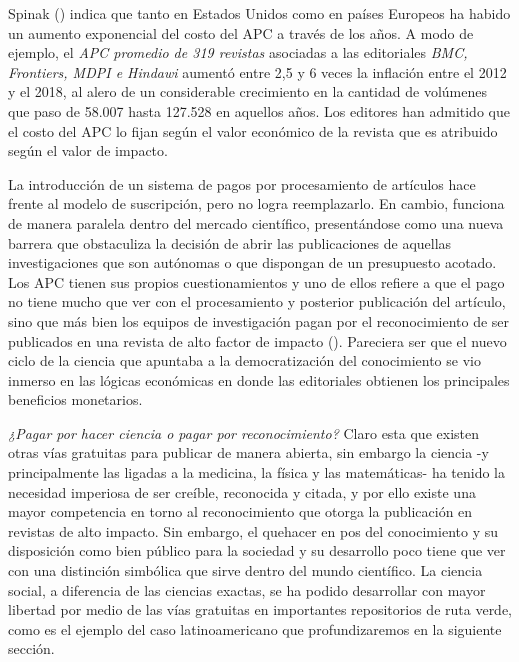 \documentclass[
  spanish,
  a4paper,
  oneside]{scrbook}
\begin{document}
Spinak () indica que tanto en
Estados Unidos como en países Europeos ha habido un aumento exponencial
del costo del APC a través de los años. A modo de ejemplo, el \emph{APC
promedio de 319 revistas} asociadas a las editoriales \emph{BMC,
Frontiers, MDPI e Hindawi} aumentó entre 2,5 y 6 veces la inflación
entre el 2012 y el 2018, al alero de un considerable crecimiento en la
cantidad de volúmenes que paso de 58.007 hasta 127.528 en aquellos años.
Los editores han admitido que el costo del APC lo fijan según el valor
económico de la revista que es atribuido según el valor de impacto.

La introducción de un sistema de pagos por procesamiento de artículos
hace frente al modelo de suscripción, pero no logra reemplazarlo. En
cambio, funciona de manera paralela dentro del mercado científico,
presentándose como una nueva barrera que obstaculiza la decisión de
abrir las publicaciones de aquellas investigaciones que son autónomas o
que dispongan de un presupuesto acotado. Los APC tienen sus propios
cuestionamientos y uno de ellos refiere a que el pago no tiene mucho que
ver con el procesamiento y posterior publicación del artículo, sino que
más bien los equipos de investigación pagan por el reconocimiento de ser
publicados en una revista de alto factor de impacto
(). Pareciera
ser que el nuevo ciclo de la ciencia que apuntaba a la democratización
del conocimiento se vio inmerso en las lógicas económicas en donde las
editoriales obtienen los principales beneficios monetarios.

\emph{¿Pagar por hacer ciencia o pagar por reconocimiento?} Claro esta
que existen otras vías gratuitas para publicar de manera abierta, sin
embargo la ciencia -y principalmente las ligadas a la medicina, la
física y las matemáticas- ha tenido la necesidad imperiosa de ser
creíble, reconocida y citada, y por ello existe una mayor competencia en
torno al reconocimiento que otorga la publicación en revistas de alto
impacto. Sin embargo, el quehacer en pos del conocimiento y su
disposición como bien público para la sociedad y su desarrollo poco
tiene que ver con una distinción simbólica que sirve dentro del mundo
científico. La ciencia social, a diferencia de las ciencias exactas, se
ha podido desarrollar con mayor libertad por medio de las vías gratuitas
en importantes repositorios de ruta verde, como es el ejemplo del caso
latinoamericano que profundizaremos en la siguiente sección.
\end{document}
